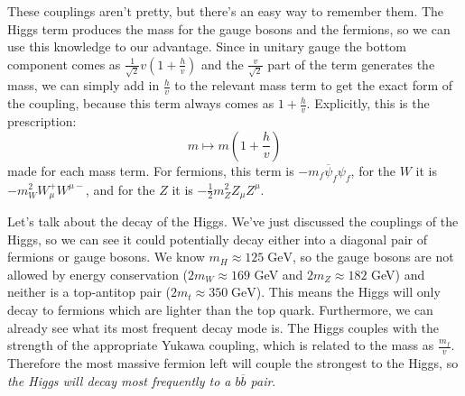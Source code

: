 \documentclass[11pt, oneside]{article}   	%
\theoremstyle{definition}
\numberwithin{equation}{subsection}		%
\begin{document}
These couplings aren't pretty, but there's an easy way to remember them. The Higgs term produces the mass for the gauge bosons and the 
fermions, so we can use this knowledge to our advantage. Since in unitary gauge the bottom component comes as $\frac{1}{\sqrt 2} v(1 + 
\frac{h}{v})$ and the $\frac{v}{\sqrt 2}$ part of the term generates the mass, we can simply add in $\frac{h}{v}$ to the relevant mass term 
to get the exact form of the coupling, because this term always comes as $1 + \frac{h}{v}$. Explicitly, this is the prescription:
\begin{equation}
	m\mapsto m\left(1 + \frac{h}{v}\right)
\end{equation}
made for each mass term. For fermions, this term is $-m_f\overline\psi_f\psi_f$, for the $W$ it is $-m_W^2 W_\mu^+ W^{\mu -}$, and for the $Z$ it 
is $-\frac{1}{2} m_Z^2 Z_\mu Z^\mu$. 

Let's talk about the decay of the Higgs. We've just discussed the couplings of the Higgs, so we can see it could potentially decay either 
into a diagonal pair of fermions or gauge bosons. We know $m_H\approx 125\;\mathrm{GeV}$, so the gauge bosons are not allowed by 
energy conservation ($2m_W\approx 169$ GeV and $2m_Z\approx 182$ GeV) and neither is a top-antitop pair ($2 m_t\approx 350\;\mathrm{GeV}$). 
This means the Higgs will only decay to fermions which are lighter than the top quark. Furthermore, we can already see what its most frequent 
decay mode is. The Higgs couples with the strength of the appropriate Yukawa coupling, which is related to the mass as $\frac{m_f}{v}$. 
Therefore the most massive fermion left will couple the strongest to the Higgs, so \textit{the Higgs will decay most frequently to a $b\overline b$ 
pair}. 
\end{document}
